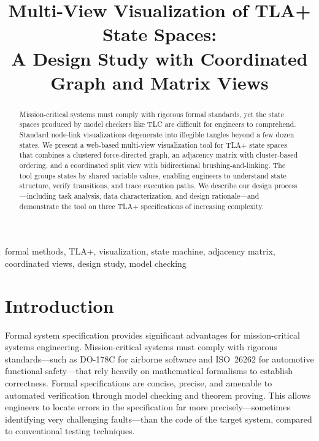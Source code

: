 \documentclass[conference]{IEEEtran}
\begin{document}
\title{Multi-View Visualization of TLA+ State Spaces:\\A Design Study with Coordinated Graph and Matrix Views}

\author{
}

\maketitle

\begin{abstract}
Mission-critical systems must comply with rigorous formal standards, yet the state spaces produced by model checkers like TLC are difficult for engineers to comprehend. Standard node-link visualizations degenerate into illegible tangles beyond a few dozen states. We present a web-based multi-view visualization tool for TLA+ state spaces that combines a clustered force-directed graph, an adjacency matrix with cluster-based ordering, and a coordinated split view with bidirectional brushing-and-linking. The tool groups states by shared variable values, enabling engineers to understand state structure, verify transitions, and trace execution paths. We describe our design process---including task analysis, data characterization, and design rationale---and demonstrate the tool on three TLA+ specifications of increasing complexity.
\end{abstract}

\begin{IEEEkeywords}
formal methods, TLA+, visualization, state machine, adjacency matrix, coordinated views, design study, model checking
\end{IEEEkeywords}

\section{Introduction}

Formal system specification provides significant advantages for mission-critical systems engineering. Mission-critical systems must comply with rigorous standards---such as DO-178C for airborne software and ISO~26262 for automotive functional safety---that rely heavily on mathematical formalisms to establish correctness. Formal specifications are concise, precise, and amenable to automated verification through model checking and theorem proving. This allows engineers to locate errors in the specification far more precisely---sometimes identifying very challenging faults---than the code of the target system, compared to conventional testing techniques.
\end{document}
